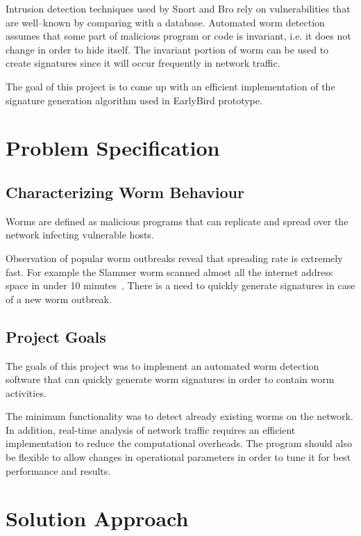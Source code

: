 \documentclass{report}
\begin{document}
Intrusion detection techniques used by Snort and Bro rely on vulnerabilities that are well--known by comparing with a database. Automated worm detection assumes that some part of malicious program or code is invariant, i.e. it does not change in order to hide itself. The invariant portion of worm can be used to create signatures since it will occur frequently in network traffic.

The goal of this project is to come up with an efficient implementation of the signature generation algorithm used in EarlyBird prototype.

\chapter{Problem Specification}

\section{Characterizing Worm Behaviour}
Worms are defined as malicious programs that can replicate and spread over the network infecting vulnerable hosts.

Observation of popular worm outbreaks reveal that spreading rate is extremely fast. For example the Slammer worm scanned almost all the internet address space in under 10 minutes~\cite{DBLP:conf/osdi/SinghEVS04}. There is a need to quickly generate signatures in case of a new worm outbreak.

\section{Project Goals}
The goals of this project was to implement an automated worm detection software that can quickly generate worm signatures in order to contain worm activities.

The minimum functionality was to detect already existing worms on the network. In addition, real-time analysis of network traffic requires an efficient implementation to reduce the computational overheads. The program should also be flexible to allow changes in operational parameters in order to tune it for best performance and results.

\chapter{Solution Approach}
\end{document}
